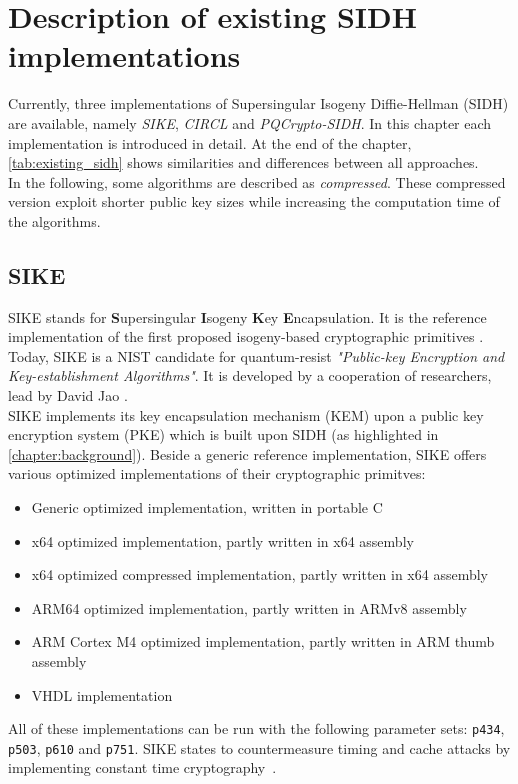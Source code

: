 \chapter{Description of existing SIDH implementations}\label{chapter:existing_sidh}
Currently, three implementations of Supersingular Isogeny Diffie-Hellman (SIDH) are available, namely \textit{SIKE}, \textit{CIRCL} and \textit{PQCrypto-SIDH}. In this chapter each implementation is introduced in detail. At the end of the chapter, \autoref{tab:existing_sidh} shows similarities and differences between all approaches.
\\
In the following, some algorithms are described as \textit{compressed}. These compressed version exploit shorter public key sizes while increasing the computation time of the algorithms.

\section{SIKE}
SIKE stands for \textbf{S}upersingular \textbf{I}sogeny \textbf{K}ey \textbf{E}ncapsulation. It is the reference implementation of the first proposed isogeny-based cryptographic primitives \parencite{jao2011towards}. Today, SIKE is a NIST candidate for quantum-resist \textit{"Public-key Encryption and Key-establishment Algorithms"}. It is developed by a cooperation of researchers, lead by David Jao \parencite{sike2020spec}.
\\
SIKE implements its key encapsulation mechanism (KEM) upon a public key encryption system (PKE) which is built upon SIDH (as highlighted in \autoref{chapter:background}). Beside a generic reference implementation, SIKE offers various optimized implementations of their cryptographic primitves:
\begin{itemize}
  \item Generic optimized implementation, written in portable C
  \item x64 optimized implementation, partly written in x64 assembly
  \item x64 optimized compressed implementation, partly written in x64 assembly
  \item ARM64 optimized implementation, partly written in ARMv8 assembly
  \item ARM Cortex M4 optimized implementation, partly written in ARM thumb assembly
  \item VHDL implementation
\end{itemize}
All of these implementations can be run with the following parameter sets: \texttt{p434}, \texttt{p503}, \texttt{p610} and \texttt{p751}. SIKE states to countermeasure timing and cache attacks by implementing constant time cryptography~\parencite{sike2020spec}.

